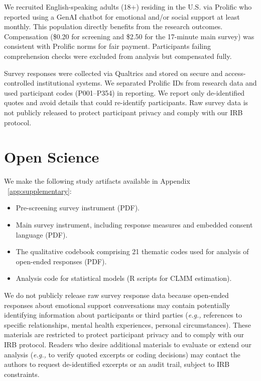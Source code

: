 \documentclass[letterpaper,twocolumn,10pt]{article}
\begin{document}
 We recruited English-speaking adults (18+) residing in the U.S. via Prolific who reported using a GenAI chatbot for emotional and/or social support at least monthly. This population directly benefits from the research outcomes. Compensation (\$0.20 for screening and \$2.50 for the 17-minute main survey) was consistent with Prolific norms for fair payment. Participants failing comprehension checks were excluded from analysis but compensated fully.

 Survey responses were collected via Qualtrics and stored on secure and access-controlled institutional systems. We separated Prolific IDs from research data and used participant codes (P001--P354) in reporting. We report only de-identified quotes and avoid details that could re-identify participants. Raw survey data is not publicly released to protect participant privacy and comply with our IRB protocol.

\section*{Open Science} \label{sec:openscience}

We make the following study artifacts available in Appendix ~\ref{app:supplementary}:

\begin{itemize}
  \item Pre-screening survey instrument (PDF).
  \item Main survey instrument, including response measures and embedded consent language (PDF).
  \item The qualitative codebook comprising 21 thematic codes used for analysis of open-ended responses (PDF).
  \item Analysis code for statistical models (R scripts for CLMM estimation).
\end{itemize}

 We do not publicly release raw survey response data because open-ended responses about emotional support conversations may contain potentially identifying information about participants or third parties (\textit{e.g.,} references to specific relationships, mental health experiences, personal circumstances). These materials are restricted to protect participant privacy and to comply with our IRB protocol. Readers who desire additional materials to evaluate or extend our analysis (\textit{e.g.,} to verify quoted excerpts or coding decisions) may contact the authors to request de-identified excerpts or an audit trail, subject to IRB constraints.
\end{document}
